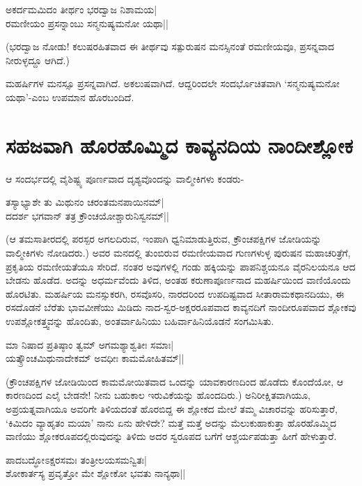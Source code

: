 \begin{shloka} 
ಅಕರ್ದಮಮಿದಂ ತೀರ್ಥಂ ಭರದ್ವಾಜ ನಿಶಾಮಯ|\label{156}\\ 
ರಮಣೀಯಂ ಪ್ರಸನ್ನಾಂಬು ಸನ್ಮನುಷ್ಯಮನೋ ಯಥಾ||
\end{shloka} 

(ಭರದ್ವಾಜ ನೋಡು! ಕಲುಷರಹಿತವಾದ ಈ ತೀರ್ಥವು ಸತ್ಪುರುಷನ ಮನಸ್ಸಿನಂತೆ ರಮಣೀಯವೂ, ಪ್ರಸನ್ನವಾದ ನೀರುಳ್ಳದ್ದೂ ಆಗಿದೆ.) 

ಮಹರ್ಷಿಗಳ ಮನಸ್ಸೂ ಪ್ರಸನ್ನವಾಗಿದೆ. ಅಕಲುಷವಾಗಿದೆ. ಆದ್ದರಿಂದಲೇ ಸಂದರ್ಭೊಚಿತವಾಗಿ `ಸನ್ಮನುಷ್ಯಮನೋ ಯಥಾ'-ಎಂಬ ಉಪಮಾನ ಹೊರಬಂದಿದೆ. 

\section*{ಸಹಜವಾಗಿ ಹೊರಹೊಮ್ಮಿದ ಕಾವ್ಯನದಿಯ ನಾಂದೀಶ್ಲೋಕ} 

ಆ ಸಂದರ್ಭದಲ್ಲಿ ವೈಶಿಷ್ಟ್ಯ ಪೂರ್ಣವಾದ ದೃಶ್ಯವೊಂದನ್ನು ವಾಲ್ಮೀಕಿಗಳು ಕಂಡರು- 

\begin{shloka} 
ತಸ್ಯಾಭ್ಯಾಶೇ ತು ಮಿಥುನಂ ಚರಂತಮನಪಾಯಿನಮ್‍|\label{156a}\\ 
ದದರ್ಶ ಭಗವಾನ್ ತತ್ರ ಕ್ರೌಂಚಯೋಶ್ಚಾರುನಿಸ್ವನಮ್‍||
\end{shloka} 

(ಆ ತಮಸಾತೀರದಲ್ಲಿ ಪರಸ್ಪರ ಅಗಲದಿರುವ, ಇಂಪಾಗಿ ಧ್ವನಿಮಾಡುತ್ತಿರುವ, ಕ್ರೌಂಚಪಕ್ಷಿಗಳ ಜೋಡಿಯನ್ನು ವಾಲ್ಮೀಕಿಗಳು ನೋಡಿದರು.) ಅವರ ಮನದಲ್ಲಿ ತುಂಬಿರುವ ರಮಣೀಯವಾದ ಗುಣಗಳುಳ್ಳ ಪುರುಷನ ಮಹಾಚರಿತ್ರೆಗೆ, ಪ್ರಕೃತಿಯ ರಮಣೀಯತೆಯೂ ಸೇರಿದೆ. ನಂತರ ಅವುಗಳಲ್ಲಿ ಗಂಡು ಹಕ್ಕಿಯನ್ನು ಪಾಪನಿಶ್ಚಯನೂ ವೈರನಿಲಯನೂ ಆದ ಬೇಡನು ಹೊಡೆದ. ಅದನ್ನು ಅಧರ್ಮವೆಂದು ತಿಳಿದ, ಅಂತಹ ಕರುಣಾಪೂರ್ಣನಾದ ಮಹರ್ಷಿಯಿಂದ ವಾಣಿಯೊಂದು ಹೊರಟಿತು. ಮಹರ್ಷಿಯ ಮನಸ್ಸುಕರಗಿ, ರಸವೊಸರಿ, ನಾರದರಿಂದ ಉಪದಿಷ್ಟವಾದ ಸೀತಾರಾಮಕಥಾನದಿಯು, ಈ ರಸದೊಡನೆ ಬೆರೆತು ಭಾವವೀಣೆಯು ಮಿಡಿದು ನಾದ-ಸ್ವರ-ಅಕ್ಷರರೂಪವಾದ ಕಾವ್ಯನದಿಗೆ ನಾಂದೀರೂಪವಾದ ಶ್ಲೋಕವು ಉಪಶ್ಲೋಕತ್ತ್ವವನ್ನು ಹೊಂದಿತು, ಅಂತರ್ವಾಹಿನಿಯು ಬಹಿರ್ವಾಹಿನಿಯೊಡನೆ ಸಂಗಮಿಸಿತು. 

\begin{shloka} 
ಮಾ ನಿಷಾದ ಪ್ರತಿಷ್ಠಾಂ ತ್ವಮ್‍ ಅಗಮಶ್ಯಾಶ್ವತೀಃ ಸಮಾಃ|\\ 
ಯತ್ಕ್ರೌಂಚಮಿಥುನಾದೇಕಮ್‍ ಅವಧೀಃ ಕಾಮಮೋಹಿತಮ್‍||
\end{shloka} 

(ಕ್ರೌಂಚಪಕ್ಷಿಗಳ ಜೋಡಿಯಿಂದ ಕಾಮಮೋಯಿತವಾದ ಒಂದನ್ನು ಯಾವಕಾರಣದಿಂದ ಹೊಡೆದು ಕೊಂದೆಯೋ, ಆ ಕಾರಣದಿಂದ ಎಲೈ ಬೇಡನೇ! ನೀನು ಬಹುಕಾಲ ಇರುವಿಕೆಯನ್ನು ಹೊಂದದಿರು.) ಅನಿರೀಕ್ಷಿತವಾಗಿಯೂ, ಅಪ್ರಯತ್ನವಾಗಿಯೂ ಅವರಿಗೇ ತಿಳಿಯದಂತೆ ಹೊರಬಿದ್ದ ಈ ಶ್ಲೋಕದ ಮೇಲೆ ತಮ್ಮ ವಿಚಾರವನ್ನು ಹರಿಸುತ್ತಾರೆ, `ಕಿಮಿದಂ ವ್ಯಾಹೃತಂ ಮಯಾ'\label{157} ನಾನು ಏನು ಹೇಳಿದೇ? ಮತ್ತೆ ಮತ್ತೆ ಅದನ್ನು ಮೆಲುಕುಹಾಕುತ್ತಾ ಹೊರಹೊಮ್ಮಿದ ವಾಣಿಯು ಶ್ಲೋಕರೂಪದಲ್ಲಿರುವುದನ್ನು ತಿಳಿದು ಅದರ ಸ್ವರೂಪದ ಬಗೆಗೆ ಆಶ್ಚರ್ಯಪಡುತ್ತಾ ಹೀಗೆ ಹೇಳುತ್ತಾರೆ. 

\begin{shloka} 
ಪಾದಬದ್ಧೋಽಕ್ಷರಸಮಃ ತಂತ್ರೀಲಯಸಮನ್ವಿತಃ|\label{157a}\\ 
ಶೋಕಾರ್ತಸ್ಯ ಪ್ರವೃತ್ತೋ ಮೇ ಶ್ಲೋಕೋ ಭವತು ನಾನ್ಯಥಾ||
\end{shloka}

